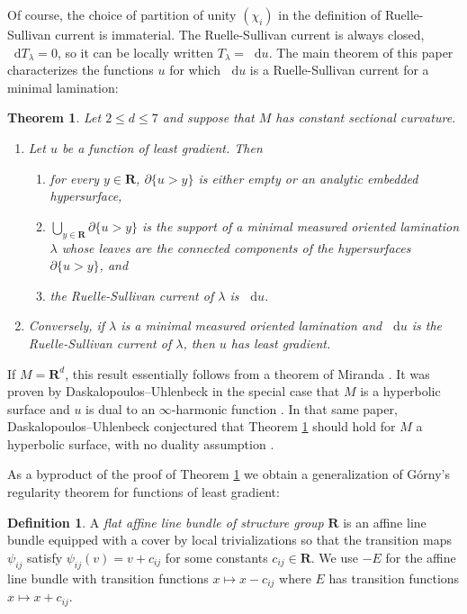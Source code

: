 \documentclass[reqno,10pt]{amsart}
\newcommand{\RR}{\mathbf{R}}
\newcommand*\dif{\mathop{}\!\mathrm{d}}
\newcommand{\dfn}[1]{\emph{#1}\index{#1}}
\newtheorem{mainthm}{Theorem}
\theoremstyle{definition}
\newtheorem{definition}[theorem]{Definition}
\numberwithin{equation}{section}
\begin{document}
Of course, the choice of partition of unity $(\chi_i)$ in the definition of Ruelle-Sullivan current is immaterial.
The Ruelle-Sullivan current is always closed, $\dif T_\lambda = 0$, so it can be locally written $T_\lambda = \dif u$.
The main theorem of this paper characterizes the functions $u$ for which $\dif u$ is a Ruelle-Sullivan current for a minimal lamination:

\begin{mainthm}\label{main thm}
Let $2 \leq d \leq 7$ and suppose that $M$ has constant sectional curvature.
\begin{enumerate}
\item Let $u$ be a function of least gradient.
Then
\begin{enumerate}
\item for every $y \in \RR$, $\partial \{u > y\}$ is either empty or an analytic embedded hypersurface,
\item $\bigcup_{y \in \RR} \partial \{u > y\}$ is the support of a minimal measured oriented lamination $\lambda$ whose leaves are the connected components of the hypersurfaces $\partial \{u > y\}$, and 
\item the Ruelle-Sullivan current of $\lambda$ is $\dif u$.
\end{enumerate}
\item Conversely, if $\lambda$ is a minimal measured oriented lamination and $\dif u$ is the Ruelle-Sullivan current of $\lambda$, then $u$ has least gradient.
\end{enumerate}
\end{mainthm}

If $M = \RR^d$, this result essentially follows from a theorem of Miranda \cite{Miranda66}.
It was proven by Daskalopoulos--Uhlenbeck in the special case that $M$ is a hyperbolic surface and $u$ is dual to an $\infty$-harmonic function \cite[Theorem 5.2, Theorem 6.10]{daskalopoulos2020transverse}.
In that same paper, Daskalopoulos--Uhlenbeck conjectured that Theorem \ref{main thm} should hold for $M$ a hyperbolic surface, with no duality assumption \cite[Problem 9.4, Conjecture 9.5]{daskalopoulos2020transverse}.

As a byproduct of the proof of Theorem \ref{main thm} we obtain a generalization of G\'orny's regularity theorem \cite[Theorem 1.2]{górny2017planar} for functions of least gradient:

\begin{definition}\label{twisted function dfn}
A \dfn{flat affine line bundle of structure group} $\RR$ is an affine line bundle equipped with a cover by local trivializations so that the transition maps $\psi_{ij}$ satisfy $\psi_{ij}(v) = v + c_{ij}$ for some constants $c_{ij} \in \RR$.
We use $-E$ for the affine line bundle with transition functions $x \mapsto x - c_{ij}$ where $E$ has transition functions $x \mapsto x + c_{ij}$.
\end{definition}
\end{document}
